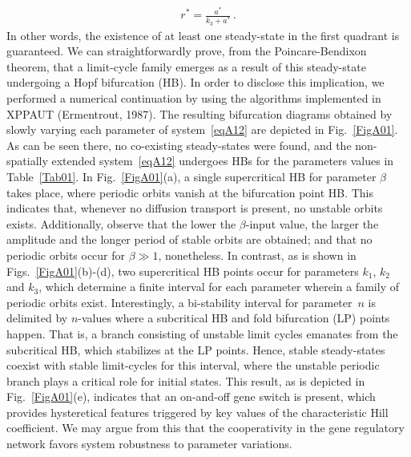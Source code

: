 \documentclass[%
 preprint,
 aip, 
 amsmath,amssymb,
]{revtex4-2}
\begin{document}
	\begin{gather*}
	r^* = \frac{a^*}{k_3+a^*}\,.
	\end{gather*}
	In other words, the existence of at least one steady-state in the first quadrant is guaranteed. We can straightforwardly prove, from the Poincare-Bendixon theorem, that a limit-cycle family emerges as a result of this steady-state undergoing a Hopf bifurcation (HB). In order to disclose this implication, we performed a numerical continuation by using the algorithms implemented in XPPAUT (Ermentrout, 1987). The resulting bifurcation diagrams obtained by slowly varying each parameter of system~\eqref{eqA12} are depicted in Fig.~\ref{FigA01}. As can be seen there, no co-existing steady-states were found, and the non-spatially extended system~\eqref{eqA12} undergoes HBs for the parameters values in Table~\ref{Tab01}. In Fig.~\ref{FigA01}(a), a single supercritical HB for parameter $\beta$ takes place, where periodic orbits vanish at the bifurcation point HB. This indicates that, whenever no diffusion transport  is present, no unstable orbits exists. Additionally, observe that the lower the $\beta$-input value, the larger the amplitude and the longer period of stable orbits are obtained; and that no periodic orbits occur for $\beta\gg1$, nonetheless. In contrast, as is shown in Figs.~\ref{FigA01}(b)-(d), two supercritical HB points occur for parameters $k_1$, $k_2$ and $k_3$, which determine a finite interval for each parameter wherein a family of periodic orbits exist. Interestingly, a bi-stability interval for parameter~$n$ is delimited by $n$-values where a subcritical HB and fold bifurcation (LP) points happen. That is, a branch consisting of unstable limit cycles emanates from the subcritical HB, which stabilizes at the LP points. Hence, stable steady-states coexist with stable limit-cycles for this interval, where the unstable periodic branch plays a critical role for initial states. This result, as is depicted in Fig.~\ref{FigA01}(e), indicates that an on-and-off gene switch is present, which provides hysteretical features triggered by key values of the characteristic Hill coefficient. We may argue from this that the cooperativity in the gene regulatory network favors system robustness to parameter variations.
	
%	
	
\end{document}
